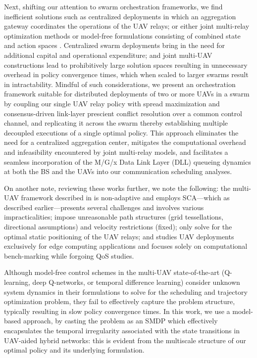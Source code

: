 \documentclass[12pt, draftcls, onecolumn]{IEEEtran}
\theoremstyle{plain}
\theoremstyle{definition}
\theoremstyle{remark}
\begin{document}
Next, shifting our attention to swarm orchestration frameworks, we find inefficient solutions such as centralized deployments \cite{JointTrajectoryDesign, MultiDroneDeployment, CSCA-ADMM} in which an aggregation gateway coordinates the operations of the UAV relays; or either joint multi-relay optimization methods \cite{CSCA-ADMM, GameTheory, UAVDynamicCoverage} or model-free formulations consisting of combined state and action spaces \cite{DDQN, MEC-DDPG, DQNPositioning, MLDeployment}. Centralized swarm deployments bring in the need for additional capital and operational expenditure; and joint multi-UAV constructions lead to prohibitively large solution spaces resulting in unnecessary overhead in policy convergence times, which when scaled to larger swarms result in intractability. Mindful of such considerations, we present an orchestration framework suitable for distributed deployments of two or more UAVs in a swarm by coupling our single UAV relay policy with spread maximization and consensus-driven link-layer prescient conflict resolution over a common control channel, and replicating it across the swarm thereby establishing multiple decoupled executions of a single optimal policy. This approach eliminates the need for a centralized aggregation center, mitigates the computational overhead and infeasibility encountered by joint multi-relay models, and facilitates a seamless incorporation of the M/G/x Data Link Layer (DLL) queueing dynamics at both the BS and the UAVs into our communication scheduling analyses. 

On another note, reviewing these works further, we note the following: the multi-UAV framework described in \cite{CSCA-ADMM} is non-adaptive and employs SCA---which as described earlier---presents several challenges and involves various impracticalities; \cite{DDQN, MEC-DDPG} impose unreasonable path structures (grid tessellations, directional assumptions) and velocity restrictions (fixed); \cite{DQNPositioning, MLDeployment} only solve for the optimal static positioning of the UAV relays; and \cite{MEC-DDPG} studies UAV deployments exclusively for edge computing applications and focuses solely on computational bench-marking while forgoing QoS studies. 

Although model-free control schemes in the multi-UAV state-of-the-art (Q-learning, deep Q-networks, or temporal difference learning) \cite{DDQN, MEC-DDPG, RLSenseSend, DQNPositioning, MLDeployment} consider unknown system dynamics in their formulations to solve for the scheduling and trajectory optimization problem, they fail to effectively capture the problem structure, typically resulting in slow policy convergence times. In this work, we use a model-based approach, by casting the problem as an SMDP which effectively encapsulates the temporal irregularity associated with the state transitions in UAV-aided hybrid networks: this is evident from the multiscale structure of our optimal policy and its underlying formulation. 
\end{document}
